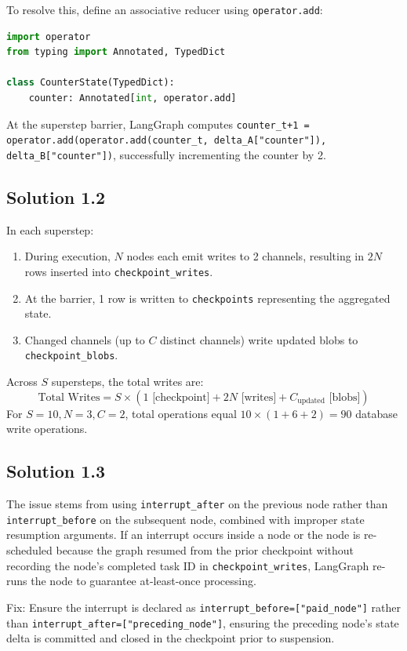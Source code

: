 To resolve this, define an associative reducer using \texttt{operator.add}:
\begin{lstlisting}[language=Python]
import operator
from typing import Annotated, TypedDict

class CounterState(TypedDict):
    counter: Annotated[int, operator.add]
\end{lstlisting}
At the superstep barrier, LangGraph computes \texttt{counter\_{t+1} = operator.add(operator.add(counter\_t, delta\_A["counter"]), delta\_B["counter"])}, successfully incrementing the counter by 2.

\subsection*{Solution 1.2}
In each superstep:
\begin{enumerate}
  \item During execution, $N$ nodes each emit writes to 2 channels, resulting in $2N$ rows inserted into \texttt{checkpoint\_writes}.
  \item At the barrier, 1 row is written to \texttt{checkpoints} representing the aggregated state.
  \item Changed channels (up to $C$ distinct channels) write updated blobs to \texttt{checkpoint\_blobs}.
\end{enumerate}
Across $S$ supersteps, the total writes are:
\[
\text{Total Writes} = S \times (1 \text{ [checkpoint]} + 2N \text{ [writes]} + C_{\text{updated}} \text{ [blobs]})
\]
For $S=10, N=3, C=2$, total operations equal $10 \times (1 + 6 + 2) = 90$ database write operations.

\subsection*{Solution 1.3}
The issue stems from using \texttt{interrupt\_after} on the previous node rather than \texttt{interrupt\_before} on the subsequent node, combined with improper state resumption arguments. If an interrupt occurs inside a node or the node is re-scheduled because the graph resumed from the prior checkpoint without recording the node's completed task ID in \texttt{checkpoint\_writes}, LangGraph re-runs the node to guarantee at-least-once processing. 

Fix: Ensure the interrupt is declared as \texttt{interrupt\_before=["paid\_node"]} rather than \texttt{interrupt\_after=["preceding\_node"]}, ensuring the preceding node's state delta is committed and closed in the checkpoint prior to suspension.

